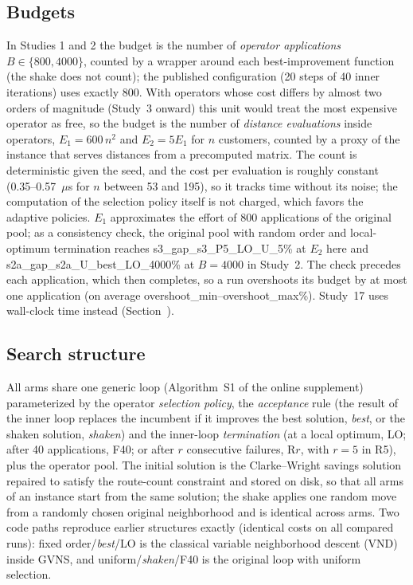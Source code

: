 \subsection{Budgets}\label{sec:budgets}
In Studies 1 and 2 the budget is the number of \emph{operator applications} $B\in\{800,4000\}$, counted by a wrapper around each best-improvement function (the shake does not count); the published configuration (20 steps of 40 inner iterations) uses exactly 800. With operators whose cost differs by almost two orders of magnitude (Study~3 onward) this unit would treat the most expensive operator as free, so the budget is the number of \emph{distance evaluations} inside operators, $E_1=600\,n^2$ and $E_2=5E_1$ for $n$ customers, counted by a proxy of the instance that serves distances from a precomputed matrix. The count is deterministic given the seed, and the cost per evaluation is roughly constant (0.35--0.57~$\mu$s for $n$ between 53 and 195), so it tracks time without its noise; the computation of the selection policy itself is not charged, which favors the adaptive policies. $E_1$ approximates the effort of 800 applications of the original pool; as a consistency check, the original pool with random order and local-optimum termination reaches \num{s3_gap_s3_P5_LO_U_5}\% at $E_2$ here and \num{s2a_gap_s2a_U_best_LO_4000}\% at $B=4000$ in Study~2. The check precedes each application, which then completes, so a run overshoots its budget by at most one application (on average \num{overshoot_min}--\num{overshoot_max}\%). Study~17 uses wall-clock time instead (Section~).

\subsection{Search structure}\label{sec:structure}
All arms share one generic loop (Algorithm~S1 of the online supplement) parameterized by the operator \emph{selection policy}, the \emph{acceptance} rule (the result of the inner loop replaces the incumbent if it improves the best solution, \textit{best}, or the shaken solution, \textit{shaken}) and the inner-loop \emph{termination} (at a local optimum, LO; after 40 applications, F40; or after $r$ consecutive failures, R$r$, with $r=5$ in R5), plus the operator pool. The initial solution is the Clarke--Wright savings solution repaired to satisfy the route-count constraint and stored on disk, so that all arms of an instance start from the same solution; the shake applies one random move from a randomly chosen original neighborhood and is identical across arms. Two code paths reproduce earlier structures exactly (identical costs on all compared runs): fixed order/\textit{best}/LO is the classical variable neighborhood descent (VND) inside GVNS, and uniform/\textit{shaken}/F40 is the original loop with uniform selection.
